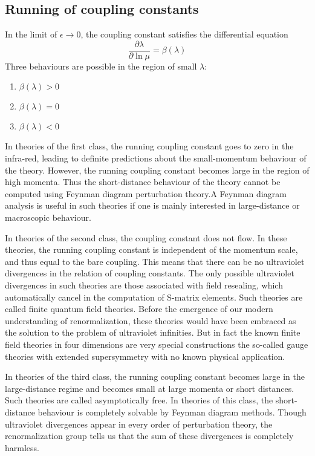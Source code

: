 \subsection{Running of coupling constants}
In the limit of $\epsilon \to 0$, the coupling constant satisfies the differential equation
\[\frac{\partial \lambda}{\partial \ln \mu} = \beta(\lambda)\]
Three behaviours are possible in the region of small $\lambda$:
\begin{enumerate}
\item $\beta(\lambda) > 0$
\item $\beta(\lambda) = 0$
\item $\beta(\lambda) < 0$
\end{enumerate}

In theories of the first class, the running coupling constant goes to zero in the infra-red, leading to definite predictions about the small-momentum behaviour of the theory. However, the running coupling constant becomes large in the region of high momenta. Thus the short-distance behaviour of the theory cannot be computed using Feynman diagram perturbation theory.A Feynman diagram analysis is useful in such theories if one is mainly interested in large-distance or macroscopic behaviour.

In theories of the second class, the coupling constant does not flow. In these theories, the running coupling constant is independent of the momentum scale, and thus equal to the bare coupling. This means that there can be no ultraviolet divergences in the relation of coupling constants. The only possible ultraviolet divergences in such theories are those associated with field resealing, which automatically cancel in the computation of S-matrix elements. Such theories are called finite quantum field theories. Before the emergence of our modern understanding of renormalization, these theories would have been embraced as the solution to the problem of ultraviolet infinities. But in fact the known finite field theories in four dimensions are very special constructions the so-called gauge theories with extended supersymmetry with no known physical application. 

In theories of the third class, the running coupling constant becomes large in the large-distance regime and becomes small at large momenta or short distances. Such theories are called asymptotically free. In theories of this class, the short-distance behaviour is completely solvable by Feynman diagram methods. Though ultraviolet divergences appear in every order of perturbation theory, the renormalization group tells us that the sum of these divergences is completely harmless.

